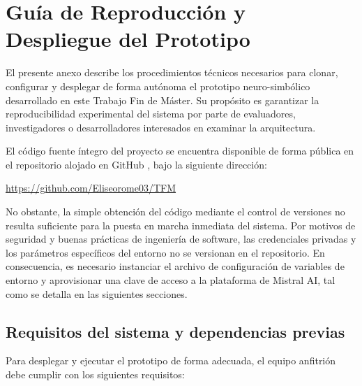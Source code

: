 
\chapter{Guía de Reproducción y Despliegue del Prototipo}
\label{anexo:despliegue}

El presente anexo describe los procedimientos técnicos necesarios para clonar, configurar y desplegar de forma autónoma el prototipo neuro-simbólico desarrollado en este Trabajo Fin de Máster. Su propósito es garantizar la reproducibilidad experimental del sistema por parte de evaluadores, investigadores o desarrolladores interesados en examinar la arquitectura.

El código fuente íntegro del proyecto se encuentra disponible de forma pública en el repositorio alojado en GitHub \cite{tfmGitHub}, bajo la siguiente dirección:

\begin{center}
\url{https://github.com/Eliseorome03/TFM}
\end{center}

No obstante, la simple obtención del código mediante el control de versiones no resulta suficiente para la puesta en marcha inmediata del sistema. Por motivos de seguridad y buenas prácticas de ingeniería de software, las credenciales privadas y los parámetros específicos del entorno no se versionan en el repositorio. En consecuencia, es necesario instanciar el archivo de configuración de variables de entorno y aprovisionar una clave de acceso a la plataforma de Mistral AI, tal como se detalla en las siguientes secciones.

\section{Requisitos del sistema y dependencias previas}

Para desplegar y ejecutar el prototipo de forma adecuada, el equipo anfitrión debe cumplir con los siguientes requisitos:

